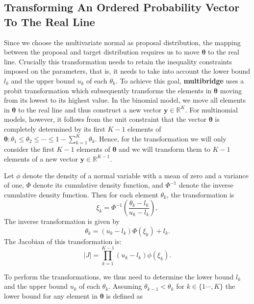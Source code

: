 \documentclass[
  english,
  man,floatsintext]{apa6}
\begin{document}
\begin{appendix}
\hypertarget{transforming-an-ordered-probability-vector-to-the-real-line}{%
\section{Transforming An Ordered Probability Vector To The Real
Line}\label{transforming-an-ordered-probability-vector-to-the-real-line}}

Since we choose the multivariate normal as proposal distribution, the
mapping between the proposal and target distribution requires us to move
\(\boldsymbol{\theta}\) to the real line. Crucially this transformation
needs to retain the inequality constraints imposed on the parameters,
that is, it needs to take into account the lower bound \(l_k\) and the
upper bound \(u_k\) of each \(\theta_k\). To achieve this goal,
\textbf{multibridge} uses a probit transformation which subsequently
transforms the elements in \(\boldsymbol{\theta}\) moving from its
lowest to its highest value. In the binomial model, we move all elements
in \(\boldsymbol{\theta}\) to the real line and thus construct a new
vector \(\boldsymbol{y} \in \mathbb{R}^{K}\). For multinomial models,
however, it follows from the unit constraint that the vector
\(\boldsymbol{\theta}\) is completely determined by its first \(K - 1\)
elements of
\(\boldsymbol{\theta}: \theta_1 \leq \theta_2 \leq \cdots \leq 1 - \sum_{k = 1}^K \theta_k\).
Hence, for the transformation we will only consider the first \(K - 1\)
elements of \(\boldsymbol{\theta}\) and we will transform them to
\(K - 1\) elements of a new vector
\(\boldsymbol{y} \in \mathbb{R}^{K - 1}\).

Let \(\phi\) denote the density of a normal variable with a mean of zero
and a variance of one, \(\Phi\) denote its cumulative density function,
and \(\Phi^{-1}\) denote the inverse cumulative density function. Then
for each element \(\theta_k\), the transformation is
\[\xi_k = \Phi^{-1}\left(\frac{\theta_k - l_k}{u_k - l_k}\right),\] The
inverse transformation is given by
\[\theta_k = (u_k - l_k) \Phi(\xi_k) + l_k.\] The Jacobian of this
transformation is:
\[\left|J\right| = \prod_{k = 1}^{K - 1}  \left(u_k - l_k \right) \phi(\xi_k).\]

To perform the transformations, we thus need to determine the lower
bound \(l_k\) and the upper bound \(u_k\) of each \(\theta_k\). Assuming
\(\theta_{k-1} < \theta_{k}\) for \(k \in \{1 \cdots, K\}\) the lower
bound for any element in \(\boldsymbol{\theta}\) is defined as


\end{appendix}
\end{document}
